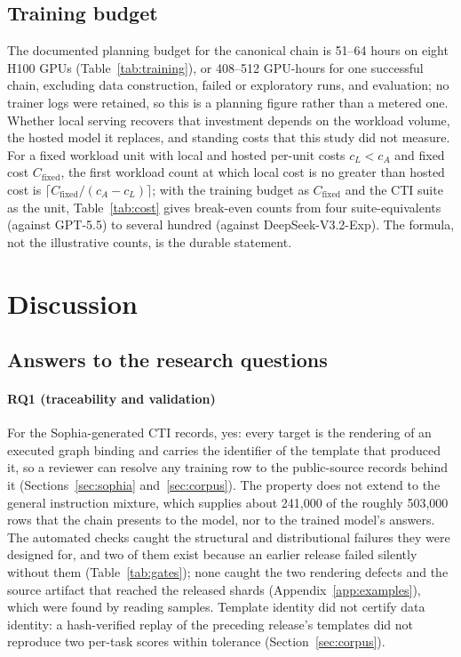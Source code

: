 \documentclass[twocolumn]{svjour3}
\begin{document}
\subsection{Training budget}
The documented planning budget for the canonical chain is 51--64 hours on eight H100 GPUs (Table~\ref{tab:training}), or 408--512 GPU-hours for one successful chain, excluding data construction, failed or exploratory runs, and evaluation; no trainer logs were retained, so this is a planning figure rather than a metered one. Whether local serving recovers that investment depends on the workload volume, the hosted model it replaces, and standing costs that this study did not measure. For a fixed workload unit with local and hosted per-unit costs $c_L<c_A$ and fixed cost $C_{\mathrm{fixed}}$, the first workload count at which local cost is no greater than hosted cost is $\lceil C_{\mathrm{fixed}}/(c_A-c_L)\rceil$; with the training budget as $C_{\mathrm{fixed}}$ and the CTI suite as the unit, Table~\ref{tab:cost} gives break-even counts from four suite-equivalents (against GPT-5.5) to several hundred (against DeepSeek-V3.2-Exp). The formula, not the illustrative counts, is the durable statement.


\section{Discussion}\label{sec:discussion}
\subsection{Answers to the research questions}\label{sec:rqanswers}
\paragraph{RQ1 (traceability and validation)}
For the Sophia-generated CTI records, yes: every target is the rendering of an executed graph binding and carries the identifier of the template that produced it, so a reviewer can resolve any training row to the public-source records behind it (Sections~\ref{sec:sophia} and~\ref{sec:corpus}). The property does not extend to the general instruction mixture, which supplies about 241,000 of the roughly 503,000 rows that the chain presents to the model, nor to the trained model's answers. The automated checks caught the structural and distributional failures they were designed for, and two of them exist because an earlier release failed silently without them (Table~\ref{tab:gates}); none caught the two rendering defects and the source artifact that reached the released shards (Appendix~\ref{app:examples}), which were found by reading samples. Template identity did not certify data identity: a hash-verified replay of the preceding release's templates did not reproduce two per-task scores within tolerance (Section~\ref{sec:corpus}).
\end{document}
